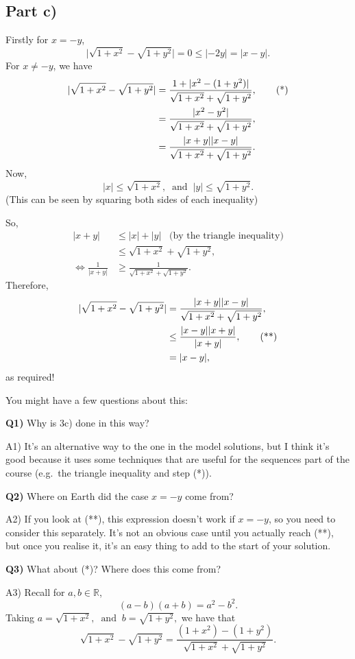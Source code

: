 \documentclass[
  10pt,
  a4paper]{article}
\theoremstyle{plain}
\theoremstyle{definition}
\theoremstyle{plain}
\theoremstyle{plain}
\theoremstyle{plain}
\theoremstyle{plain}
\theoremstyle{definition}
\theoremstyle{definition}
\theoremstyle{remark}
\theoremstyle{remark}
\let\BeginKnitrBlock\begin \let\EndKnitrBlock\end
\begin{document}
\hypertarget{part-c}{%
\subsection*{Part c)}\label{part-c}}

\BeginKnitrBlock{solution*}
Firstly for \(x = -y\), \[\lvert \sqrt{1 + x^2} - \sqrt{1 + y^2}\rvert = 0 \leq \lvert -2y \rvert = \lvert x - y \rvert.\] For \(x \neq -y\), we have
\begin{align}
\lvert \sqrt{1 + x^2} - \sqrt{1 + y^2}\rvert &= \frac{1 + \lvert x^2 - (1 + y^2) \rvert}{\sqrt{1 + x^2} + \sqrt{1 + y^2}},\tag{*}\\
&= \frac{\lvert x^2 - y^2 \rvert}{\sqrt{1 + x^2} + \sqrt{1 + y^2}},\notag\\
&= \frac{\lvert x + y \rvert \lvert x - y \rvert}{\sqrt{1 + x^2} + \sqrt{1 + y^2}}.\notag
\end{align}
Now, \[\lvert x \rvert \leq \sqrt{1 + x^2}, \;\;\text{and}\;\; \lvert y \rvert \leq \sqrt{1 + y^2}.\] (This can be seen by squaring both sides of each inequality)

So,
\begin{align*}
\lvert x + y \rvert &\leq \lvert x \rvert + \lvert y \rvert \;\;\; \text{(by the triangle inequality)}\\
&\leq \sqrt{1 + x^2} + \sqrt{1 + y^2},\\
\Leftrightarrow \frac{1}{\lvert x + y \rvert} &\geq \frac{1}{\sqrt{1 + x^2} + \sqrt{1 + y^2}}.
\end{align*}
Therefore,
\begin{align}
\lvert \sqrt{1 + x^2} - \sqrt{1 + y^2}\rvert &= \frac{\lvert x + y \rvert \lvert x - y \rvert}{\sqrt{1 + x^2} + \sqrt{1 + y^2}},\notag\\
&\leq \frac{\lvert x - y \rvert\lvert x + y \rvert}{\lvert x + y \rvert},\tag{**}\\
& = \lvert x - y \rvert,\notag
\end{align}
as required!
\EndKnitrBlock{solution*}

You might have a few questions about this:

\textbf{Q1)} Why is 3c) done in this way?

A1) It's an alternative way to the one in the model solutions, but I think it's good because it uses some techniques that are useful for the sequences part of the course (e.g.~the triangle inequality and step (*)).

\textbf{Q2)} Where on Earth did the case \(x = -y\) come from?

A2) If you look at (**), this expression doesn't work if \(x = -y\), so you need to consider this separately. It's not an obvious case until you actually reach (**), but once you realise it, it's an easy thing to add to the start of your solution.

\textbf{Q3)} What about (*)? Where does this come from?

A3) Recall for \(a,b \in \mathbb{R}\), \[(a-b)(a+b) = a^2 - b^2.\] Taking \(a = \sqrt{1 + x^2}, \;\; \text{and} \;\; b = \sqrt{1 + y^2},\) we have that \[\sqrt{1 + x^2} - \sqrt{1 + y^2} = \frac{(1+x^2)-(1+y^2)}{\sqrt{1 + x^2} + \sqrt{1 + y^2}}.\]
\end{document}
